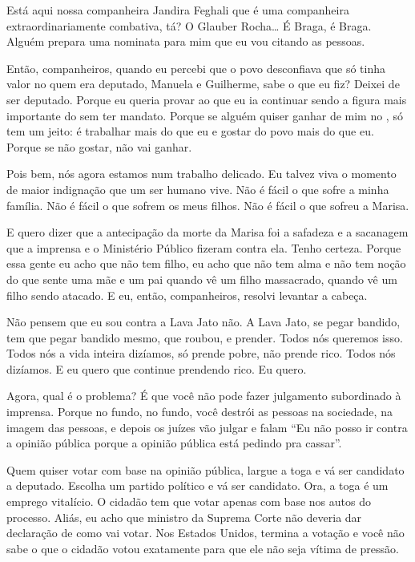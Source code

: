 Está aqui nossa companheira Jandira Feghali que é uma companheira
extraordinariamente combativa, tá? O Glauber Rocha\ldots{} É Braga, é Braga.
Alguém prepara uma nominata para mim que eu vou citando as pessoas.

Então, companheiros, quando eu percebi que o povo desconfiava que
só tinha valor no  quem era deputado, Manuela e Guilherme, sabe o que
eu fiz? Deixei de ser deputado. Porque eu queria provar ao  que eu ia
continuar sendo a figura mais importante do  sem ter mandato. Porque
se alguém quiser ganhar de mim no , só tem um jeito: é trabalhar mais
do que eu e gostar do povo mais do que eu. Porque se não gostar, não vai
ganhar.

Pois bem, nós agora estamos num trabalho delicado. Eu talvez viva
o momento de maior indignação que um ser humano vive. Não é fácil o que
sofre a minha família. Não é fácil o que sofrem os meus filhos. Não é
fácil o que sofreu a Marisa.

E quero dizer que a antecipação da morte da Marisa foi a
safadeza e a sacanagem que a imprensa e o Ministério Público fizeram
contra ela. Tenho certeza. Porque essa gente eu acho que não tem filho,
eu acho que não tem alma e não tem noção do que sente uma mãe e um pai
quando vê um filho massacrado, quando vê um filho sendo atacado. E eu,
então, companheiros, resolvi levantar a cabeça.

Não pensem que eu sou contra a Lava Jato não. A Lava Jato, se pegar
bandido, tem que pegar bandido mesmo, que roubou, e prender. Todos nós
queremos isso. Todos nós a vida inteira dizíamos, só prende pobre, não
prende rico. Todos nós dizíamos. E eu quero que continue prendendo rico.
Eu quero.

Agora, qual é o problema? É que você não pode fazer julgamento
subordinado à imprensa. Porque no fundo, no fundo, você destrói as
pessoas na sociedade, na imagem das pessoas, e depois os juízes vão
julgar e falam ``Eu não posso ir contra a opinião pública porque a
opinião pública está pedindo pra cassar''.

Quem quiser votar com base na opinião pública, largue a toga e vá
ser candidato a deputado. Escolha um partido político e vá ser
candidato. Ora, a toga é um emprego vitalício. O cidadão tem que votar
apenas com base nos autos do processo. Aliás, eu acho que ministro da
Suprema Corte não deveria dar declaração de como vai votar. Nos Estados
Unidos, termina a votação e você não sabe o que o cidadão votou
exatamente para que ele não seja vítima de pressão.

